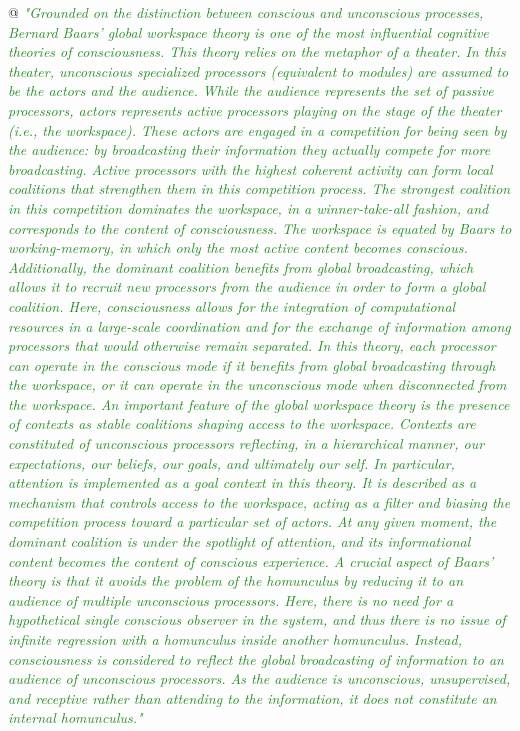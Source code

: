 \documentclass[utf8]{article}
\newenvironment{ants}
			{
			 \begin{easylist}[itemize]		
		 	}
			{
			\end{easylist}
			}
\newcommand{\rewrite}[1]{\textcolor{ForestGreen}{\textit{"#1"}}\newline}
\begin{document}
\begin{ants}
				@ \rewrite{Grounded on the distinction between conscious and unconscious processes, Bernard Baars’ global workspace theory is one of the most influential cognitive theories of consciousness. This theory relies on the metaphor of a theater. In this theater, unconscious specialized processors (equivalent to modules) are assumed to be the actors and the audience. While the audience represents the set of passive processors, actors represents active processors playing on the stage of the theater (i.e., the workspace). These actors are engaged in a competition for being seen by the audience: by broadcasting their information they actually compete for more broadcasting. Active processors with the highest coherent activity can form local coalitions that strengthen them in this competition process. The strongest coalition in this competition dominates the workspace, in a winner-take-all fashion, and corresponds to the content of consciousness. The workspace is equated by Baars to working-memory, in which only the most active content becomes conscious. Additionally, the dominant coalition benefits from global broadcasting, which allows it to recruit new processors from the audience in order to form a global coalition. Here, consciousness allows for the integration of computational resources in a large-scale coordination and for the exchange of information among processors that would otherwise remain separated. In this theory, each processor can operate in the conscious mode if it benefits from global broadcasting through the workspace, or it can operate in the unconscious mode when disconnected from the workspace. An important feature of the global workspace theory is the presence of contexts as stable coalitions shaping access to the workspace. Contexts are constituted of unconscious processors reflecting, in a hierarchical manner, our expectations, our beliefs, our goals, and ultimately our self. In particular, attention is implemented as a goal context in this theory. It is described as a mechanism that controls access to the workspace, acting as a filter and biasing the competition process toward a particular set of actors. At any given moment, the dominant coalition is under the spotlight of attention, and its informational content becomes the content of conscious experience. A crucial aspect of Baars’ theory is that it avoids the problem of the homunculus by reducing it to an audience of multiple unconscious processors. Here, there is no need for a hypothetical single conscious observer in the system, and thus there is no issue of infinite regression with a homunculus inside another homunculus. Instead, consciousness is considered to reflect the global broadcasting of information to an audience of unconscious processors. As the audience is unconscious, unsupervised, and receptive rather than attending to the information, it does not constitute an internal homunculus.}
				
				
				
			\end{ants}
		
\end{document}
